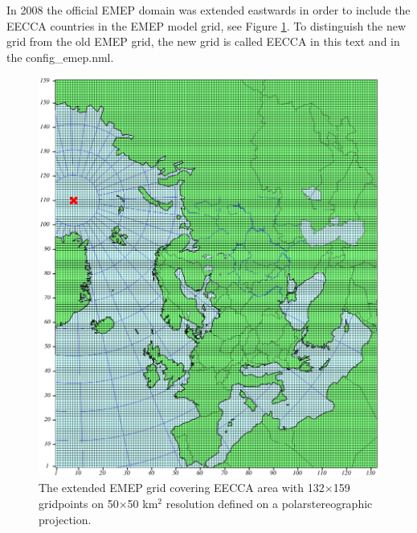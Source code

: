 In 2008 the official EMEP domain was extended eastwards in order to include the 
EECCA countries in the EMEP model grid, see Figure \ref{fig:EECCA}. To distinguish the new grid from the old EMEP 
grid, the new grid is called EECCA in this text and in the config\_emep.nml.

\begin{figure}[ht]
 \centering
\includegraphics[scale=0.7]{EECCA.eps}
\caption{The extended EMEP grid covering EECCA area with
132$\times$159 gridpoints on 50$\times$50 km$^2$ resolution defined on a polarstereographic
projection.}\label{fig:EECCA}
\end{figure}


